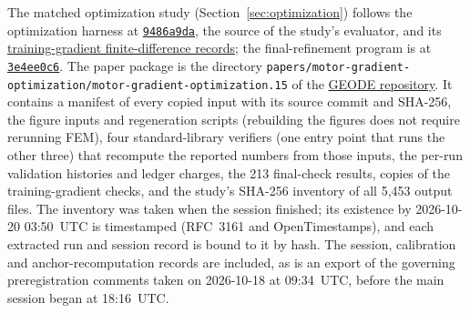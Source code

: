 \documentclass{anvil-paper}
\begin{document}
\begin{sloppypar}
The matched optimization study (Section~\ref{sec:optimization}) follows the
optimization harness at
\href{https://github.com/rjwalters/geode-fem/tree/9486a9da58beeca91968d4d3608f06b998abff45/benchmarks/motor_optimization}{\texttt{9486a9da}},
the source of the study's evaluator, and its
\href{https://github.com/rjwalters/geode-fem/tree/9486a9da58beeca91968d4d3608f06b998abff45/benchmarks/motor_optimization/runs}{training-gradient finite-difference records};
the final-refinement program is at
\href{https://github.com/rjwalters/geode-fem/tree/3e4ee0c63a86dbf014a76c9faf04dd962da16911/crates/geode-core/examples/icem_final_refinement.rs}{\texttt{3e4ee0c6}}.
The paper package is the directory
\texttt{papers/}\allowbreak\texttt{motor-gradient-optimization/}\allowbreak\texttt{motor-gradient-optimization.15}
of the \href{https://github.com/rjwalters/geode-fem}{GEODE repository}. It
contains a manifest of every copied input with its source commit and
SHA-256, the figure inputs and regeneration scripts (rebuilding the figures
does not require rerunning FEM), four standard-library verifiers (one
entry point that runs the other three) that recompute the reported numbers
from those inputs, the per-run validation
histories and ledger charges, the 213 final-check results, copies of the
training-gradient checks, and the study's SHA-256 inventory of all 5,453
output files. The inventory was taken when the session finished; its
existence by 2026-10-20 03:50~UTC is timestamped (RFC~3161 and
OpenTimestamps), and each extracted run and session record is bound to it
by hash. The session, calibration and anchor-recomputation records are
included, as is an export of the governing preregistration comments taken
on 2026-10-18 at 09:34~UTC, before the main session began at 18:16~UTC.
\end{sloppypar}
\end{document}
